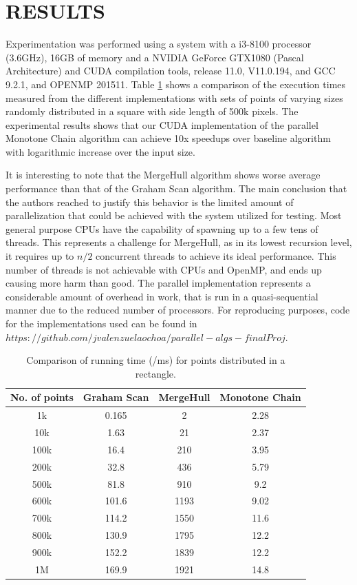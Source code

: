 \documentclass{article}
\begin{document}
\section{RESULTS}
 Experimentation was performed using a system with a i3-8100 processor (3.6GHz), 16GB of memory and a NVIDIA GeForce GTX1080 (Pascal Architecture) and CUDA compilation tools, release 11.0, V11.0.194, and GCC 9.2.1, and OPENMP 201511. 
Table \ref{runtable} shows a comparison of the execution times measured from the different implementations with sets of points of varying sizes randomly distributed in a square with side length of 500k pixels. The experimental results shows that our CUDA implementation of the parallel Monotone Chain algorithm can achieve 10x speedups over baseline algorithm with logarithmic increase over the input size.

It is interesting to note that the MergeHull algorithm shows worse average performance than that of the Graham Scan algorithm. The main conclusion that the authors reached to justify this behavior is the limited amount of parallelization that could be achieved with the system utilized for testing. Most general purpose CPUs have the capability of spawning up to a few tens of threads. This represents a challenge for MergeHull, as in its lowest recursion level, it requires up to $n/2$ concurrent threads to achieve its ideal performance. This number of threads is not achievable with CPUs and OpenMP, and ends up causing more harm than good. The parallel implementation represents a considerable amount of overhead in work, that is run in a quasi-sequential manner due to the reduced number of processors. For reproducing purposes, code for the implementations used can be found in $https://github.com/jvalenzuelaochoa/parallel-algs-finalProj$.


\begin{table}[]
\centering
\caption{Comparison of running time (/ms) for points distributed in a rectangle.}
\label{runtable}
\begin{tabular}{|c|c|c|c|}
\hline
No. of points & Graham Scan & MergeHull & Monotone Chain \\ \hline
1k            & 0.165       & 2         & 2.28           \\ \hline
10k           & 1.63        & 21        & 2.37           \\ \hline
100k          & 16.4        & 210       & 3.95           \\ \hline
200k          & 32.8        & 436       & 5.79           \\ \hline
500k          & 81.8        & 910       & 9.2            \\ \hline
600k          & 101.6       & 1193      & 9.02           \\ \hline
700k          & 114.2       & 1550      & 11.6           \\ \hline
800k          & 130.9       & 1795      & 12.2           \\ \hline
900k          & 152.2       & 1839      & 12.2           \\ \hline
1M            & 169.9       & 1921      & 14.8           \\ \hline
\end{tabular}
\end{table}
\end{document}
